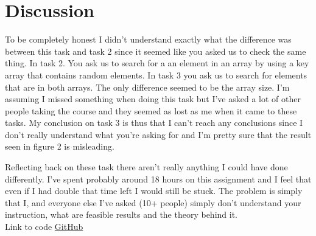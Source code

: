 \documentclass[a4paper,11pt]{article}
\begin{document}
\section*{Discussion}
To be completely honest I didn't understand exactly what the difference was between this task and task 2 since it seemed like you asked us to check the same thing.
In task 2. You ask us to search for a an element in an array by using a key array that contains random elements. In task 3 you ask us to search for elements that 
are in both arrays. The only difference seemed to be the array size. I'm assuming I missed something when doing this task but I've asked a lot of other people taking
the course and they seemed as lost as me when it came to these tasks. My conclusion on task 3 is thus that I can't reach any conclusions since I don't really 
understand what you're asking for and I'm pretty sure that the result seen in figure 2 is misleading. 

Reflecting back on these task there aren't really anything I could have done differently. I've spent probably around 18 hours on this assignment and I feel that even 
if I had double that time left I would still be stuck. The problem is simply that I, and everyone else I've asked (10+ people) simply don't understand your instruction, 
what are feasible results and the theory behind it.\\

Link to code \hyperlink{https://github.com/adrian-jonsson-sjoedin/ID1021-AlgoData/blob/main/ArrayTimes/src/Main.java}{GitHub}
\end{document}
